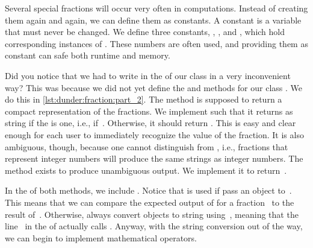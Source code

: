 Several special fractions will occur very often in computations.
Instead of creating them again and again, we can define them as constants.
A constant is a variable that must never be changed.%
%
%
%
%
%
We define three constants, , , and , which hold corresponding instances of .
These numbers are often used, and providing them as constant can safe both runtime and memory.

\afterpage{\clearpage}

Did you notice that we had to write  in the  of our class in a very inconvenient way?
This was because we did not yet define the  and  methods for our class .
We do this in \cref{lst:dunder:fraction:part_2}.
The method  is supposed to return a compact representation of the fractions.
We implement such that it returns  as string if the  is one, i.e., if~.
Otherwise, it should return .
This is easy and clear enough for each user to immediately recognize the value of the fraction.
It is also ambiguous, though, because one cannot distinguish  from , i.e., fractions that represent integer numbers will produce the same strings as integer numbers.
The  method exists to produce unambiguous output.
We implement it to return~.

In the  of both methods, we include .
Notice that  is used if pass an object to~.
This means that we can compare the expected output of  for a fraction~ to the result of~.
Otherwise,  always convert objects to string using~, meaning that the line~ in the  of  actually calls .
Anyway, with the string conversion out of the way, we can begin to implement mathematical operators.

